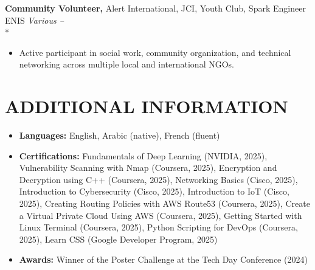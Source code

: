 \documentclass[10pt,letterpaper]{article}
\newcommand{\experienceItem}[4]{%
    \textbf{#1,} #2 \hfill \textit{#3 -- #4}\\*%
}
\begin{document}
\experienceItem{Community Volunteer}{Alert International, JCI, Youth Club, Spark Engineer ENIS}{Various}{}
\begin{itemize}[leftmargin=*, noitemsep, topsep=0pt]
    \item Active participant in social work, community organization, and technical networking across multiple local and international NGOs.
\end{itemize}

\section*{ADDITIONAL INFORMATION}

\begin{itemize}[leftmargin=*, noitemsep, topsep=0pt]
    \item \textbf{Languages:} English, Arabic (native), French (fluent)
    \item \textbf{Certifications:} Fundamentals of Deep Learning (NVIDIA, 2025), Vulnerability Scanning with Nmap (Coursera, 2025), Encryption and Decryption using C++ (Coursera, 2025), Networking Basics (Cisco, 2025), Introduction to Cybersecurity (Cisco, 2025), Introduction to IoT (Cisco, 2025), Creating Routing Policies with AWS Route53 (Coursera, 2025), Create a Virtual Private Cloud Using AWS (Coursera, 2025), Getting Started with Linux Terminal (Coursera, 2025), Python Scripting for DevOps (Coursera, 2025), Learn CSS (Google Developer Program, 2025)
    \item \textbf{Awards:} Winner of the Poster Challenge at the Tech Day Conference (2024)
\end{itemize}
\end{document}
